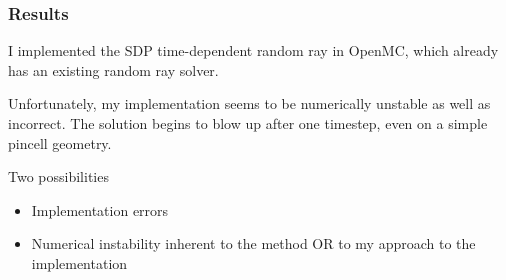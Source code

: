 \begin{frame}
  \frametitle{Results}

  I implemented the SDP time-dependent random ray in OpenMC, which already has
  an existing random ray solver.

  Unfortunately,  my implementation seems to be numerically unstable as well as
  incorrect. The solution begins to blow up after one timestep, even on a simple 
  pincell geometry.

  Two possibilities
  \begin{itemize}
      \item Implementation errors
      \item Numerical instability inherent to the method OR to my approach to
          the implementation
  \end{itemize}
\end{frame}


